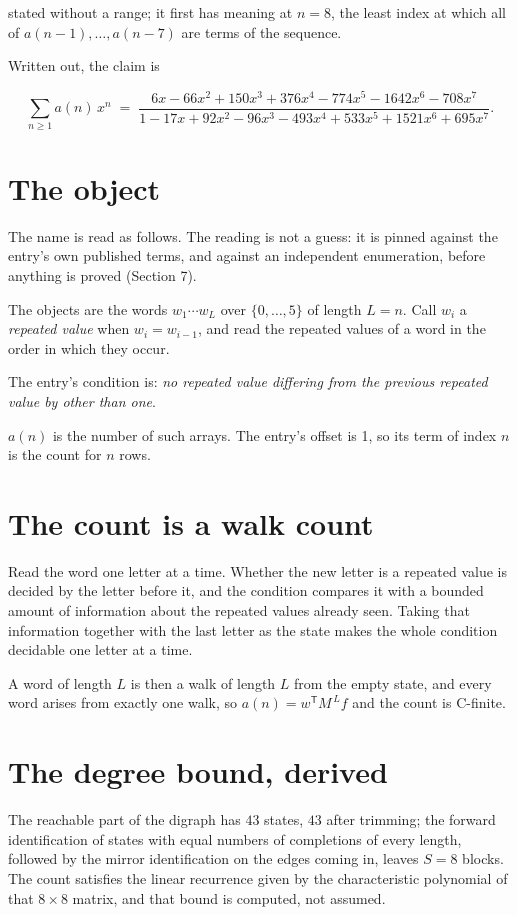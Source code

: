 \documentclass[11pt]{article}
\theoremstyle{definition}
\begin{document}
stated without a range; it first has meaning at $n = 8$, the least index at which all of $a(n-1),\dots,a(n-7)$ are terms of the sequence.

Written out, the claim is

\[\sum_{n \ge 1} a(n)\,x^n \;=\; \frac{6x - 66x^{2} + 150x^{3} + 376x^{4} - 774x^{5} - 1642x^{6} - 708x^{7}}{1 - 17x + 92x^{2} - 96x^{3} - 493x^{4} + 533x^{5} + 1521x^{6} + 695x^{7}}.\]

\section{The object}

The name is read as follows. The reading is not a guess: it is pinned against the entry's own published terms, and against an independent enumeration, before anything is proved (Section 7).

The objects are the words $w_1\cdots w_L$ over $\{0,\dots,5\}$ of length $L = n$. Call $w_i$ a {\itshape repeated value} when $w_i = w_{i-1}$, and read the repeated values of a word in the order in which they occur.

The entry's condition is: {\itshape no repeated value differing from the previous repeated value by other than one}.

$a(n)$ is the number of such arrays. The entry's offset is 1, so its term of index $n$ is the count for $n$ rows.

\section{The count is a walk count}

Read the word one letter at a time. Whether the new letter is a repeated value is decided by the letter before it, and the condition compares it with a bounded amount of information about the repeated values already seen. Taking that information together with the last letter as the state makes the whole condition decidable one letter at a time.

A word of length $L$ is then a walk of length $L$ from the empty state, and every word arises from exactly one walk, so $a(n) = w^{\mathsf T}M^{\,L}f$ and the count is C-finite.

\section{The degree bound, derived}

The reachable part of the digraph has $43$ states, $43$ after trimming; the forward identification of states with equal numbers of completions of every length, followed by the mirror identification on the edges coming in, leaves $S = 8$ blocks. The count satisfies the linear recurrence given by the characteristic polynomial of that $8\times8$ matrix, and that bound is computed, not assumed.
\end{document}
